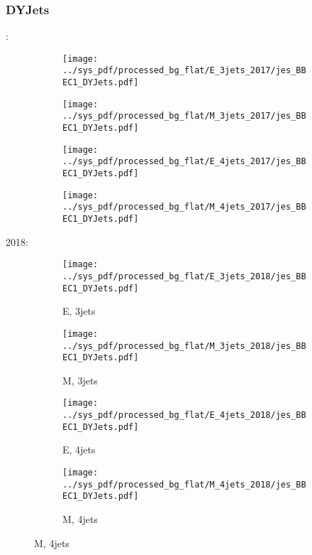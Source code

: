\documentclass{beamer}
\begin{document}
\begin{frame}
\frametitle{DYJets}
\fontsize{5}{1}:
\begin{figure}
\centering
\begin{subfigure}[b]{0.24\textwidth}
\texttt{[image: ../sys\_pdf/processed\_bg\_flat/E\_3jets\_2017/jes\_BBEC1\_DYJets.pdf]}
\end{subfigure}
\begin{subfigure}[b]{0.24\textwidth}
\texttt{[image: ../sys\_pdf/processed\_bg\_flat/M\_3jets\_2017/jes\_BBEC1\_DYJets.pdf]}
\end{subfigure}
\begin{subfigure}[b]{0.24\textwidth}
\texttt{[image: ../sys\_pdf/processed\_bg\_flat/E\_4jets\_2017/jes\_BBEC1\_DYJets.pdf]}
\end{subfigure}
\begin{subfigure}[b]{0.24\textwidth}
\texttt{[image: ../sys\_pdf/processed\_bg\_flat/M\_4jets\_2017/jes\_BBEC1\_DYJets.pdf]}
\end{subfigure}
\end{figure}
2018:
\begin{figure}
\centering
\begin{subfigure}[b]{0.24\textwidth}
\texttt{[image: ../sys\_pdf/processed\_bg\_flat/E\_3jets\_2018/jes\_BBEC1\_DYJets.pdf]}
\captionsetup{font=tiny}
\caption{E, 3jets}
\end{subfigure}
\begin{subfigure}[b]{0.24\textwidth}
\texttt{[image: ../sys\_pdf/processed\_bg\_flat/M\_3jets\_2018/jes\_BBEC1\_DYJets.pdf]}
\captionsetup{font=tiny}
\caption{M, 3jets}
\end{subfigure}
\begin{subfigure}[b]{0.24\textwidth}
\texttt{[image: ../sys\_pdf/processed\_bg\_flat/E\_4jets\_2018/jes\_BBEC1\_DYJets.pdf]}
\captionsetup{font=tiny}
\caption{E, 4jets}
\end{subfigure}
\begin{subfigure}[b]{0.24\textwidth}
\texttt{[image: ../sys\_pdf/processed\_bg\_flat/M\_4jets\_2018/jes\_BBEC1\_DYJets.pdf]}
\captionsetup{font=tiny}
\caption{M, 4jets}
\end{subfigure}
\end{figure}
\end{frame}
\end{document}
